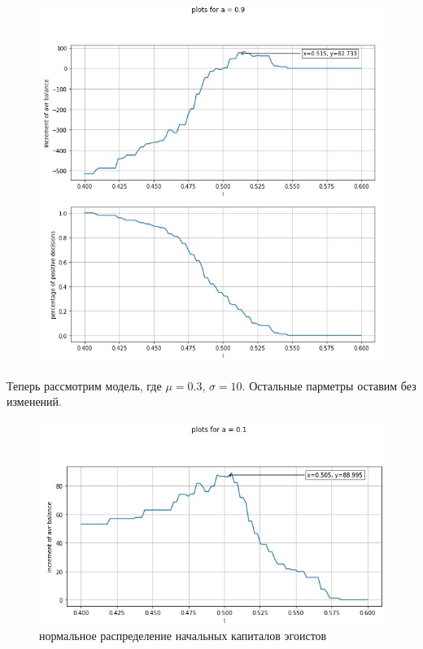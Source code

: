 \documentclass{article}
\begin{document}
\begin{figure}[H]
\begin{minipage}[h]{0.49\linewidth}
		\end{minipage}
		\hfill
		\begin{minipage}[h]{0.49\linewidth}
			\includegraphics[width=1.0\linewidth]{assets/plot_a09.jpg}
		\end{minipage}
	\end{figure}
Теперь рассмотрим модель, где $\mu = 0.3$, $\sigma = 10$. Остальные парметры оставим без изменений.
\begin{figure}[H]
	\centering
	\includegraphics[width=0.8\linewidth]{assets/plot_a01_mu_positive.jpg}
	\caption{нормальное распределение начальных капиталов эгоистов}
	\label{fig:mpr}
\end{figure}
\end{document}
